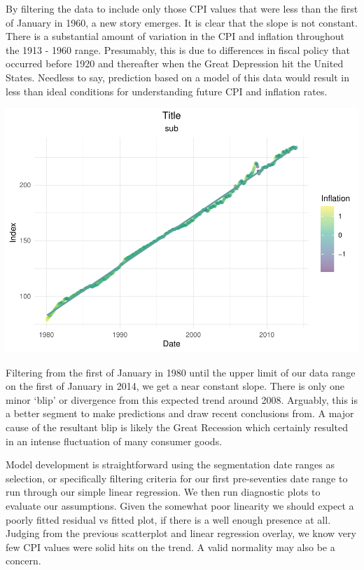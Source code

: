 \documentclass[
]{article}
\begin{document}
By filtering the data to include only those CPI values that were less
than the first of January in 1960, a new story emerges. It is clear that
the slope is not constant. There is a substantial amount of variation in
the CPI and inflation throughout the 1913 - 1960 range. Presumably, this
is due to differences in fiscal policy that occurred before 1920 and
thereafter when the Great Depression hit the United States. Needless to
say, prediction based on a model of this data would result in less than
ideal conditions for understanding future CPI and inflation rates.

\includegraphics{CPIAnalysis_files/figure-latex/unnamed-chunk-6-1.pdf}

Filtering from the first of January in 1980 until the upper limit of our
data range on the first of January in 2014, we get a near constant
slope. There is only one minor `blip' or divergence from this expected
trend around 2008. Arguably, this is a better segment to make
predictions and draw recent conclusions from. A major cause of the
resultant blip is likely the Great Recession which certainly resulted in
an intense fluctuation of many consumer goods.

Model development is straightforward using the segmentation date ranges
as selection, or specifically filtering criteria for our first
pre-seventies date range to run through our simple linear regression. We
then run diagnostic plots to evaluate our assumptions. Given the
somewhat poor linearity we should expect a poorly fitted residual vs
fitted plot, if there is a well enough presence at all. Judging from the
previous scatterplot and linear regression overlay, we know very few CPI
values were solid hits on the trend. A valid normality may also be a
concern.
\end{document}
